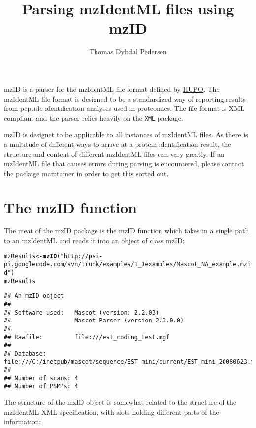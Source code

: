 \documentclass[a4paper]{article}\usepackage{graphicx, color}
\title{Parsing mzIdentML files using mzID}
\author{Thomas Dybdal Pedersen}
\makeatletter
\newcommand{\hlfunctioncall}[1]{\textcolor[rgb]{0.501960784313725,0,0.329411764705882}{\textbf{#1}}}%
\newcommand{\hlstring}[1]{\textcolor[rgb]{0.6,0.6,1}{#1}}%
\newenvironment{kframe}{%
 \def\at@end@of@kframe{}%
 \ifinner\ifhmode%
  \def\at@end@of@kframe{\end{minipage}}%
  \begin{minipage}{\columnwidth}%
 \fi\fi%
 \def\FrameCommand##1{\hskip\@totalleftmargin \hskip-\fboxsep
 \colorbox{shadecolor}{##1}\hskip-\fboxsep
     \hskip-\linewidth \hskip-\@totalleftmargin \hskip\columnwidth}%
 \MakeFramed {\advance\hsize-\width
   \@totalleftmargin\z@ \linewidth\hsize
   \@setminipage}}%
 {\par\unskip\endMakeFramed%
 \at@end@of@kframe}
\newenvironment{knitrout}{}{} %
\makeatother
\begin{document}
\maketitle



mzID is a parser for the mzIdentML file format defined by \href{<http://www.psidev.info/mzidentml>}{HUPO}. The mzIdentML file format is designed to be a standardized way of reporting results from peptide identification analyses used in proteomics. The file format is XML compliant and the parser relies heavily on the \texttt{XML} package.

mzID is designet to be applicable to all instances of mzIdentML files. As there is a multitude of different ways to arrive at a protein identification result, the structure and content of different mzIdentML files can vary greatly. If an mzIdentML file that causes errors during parsing is encountered, please contact the package maintainer in order to get this sorted out.

\section*{The mzID function}
The meat of the mzID package is the mzID function which takes in a single path to an mzIdentML and reads it into an object of class mzID:

\begin{knitrout}
\color{fgcolor}\begin{kframe}
\begin{alltt}
mzResults <- \hlfunctioncall{mzID}(\hlstring{"http://psi-pi.googlecode.com/svn/trunk/examples/1_1examples/Mascot_NA_example.mzid"})
mzResults
\end{alltt}
\begin{verbatim}
## An mzID object
## 
## Software used:   Mascot (version: 2.2.03)
##                  Mascot Parser (version 2.3.0.0)
## 
## Rawfile:         file:///est_coding_test.mgf
## 
## Database:        file:///C:/inetpub/mascot/sequence/EST_mini/current/EST_mini_20080623.fasta
## 
## Number of scans: 4
## Number of PSM's: 4
\end{verbatim}
\end{kframe}
\end{knitrout}

The structure of the mzID object is somewhat related to the structure of the mzIdentML XML specification, with slots holding different parts of the information:
\end{document}
